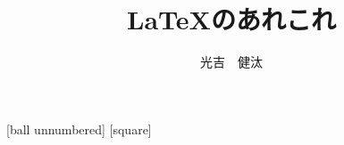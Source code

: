 \usepackage{bxdpx-beamer} %
\usepackage{pxjahyper} %
\usepackage{minijs} %
\usepackage{latexsym}
\usepackage[deluxe,expert]{otf}
\renewcommand{\kanjifamilydefault}{\gtdefault} %

\usepackage{tikz}
\usepackage{pgfplots}
\usepackage{pgfplotstable}
\usetikzlibrary{calc,decorations.pathreplacing,quotes,positioning,shapes,fit,arrows,backgrounds,tikzmark}

\usepackage{standalone}
\usepackage{import}

\usepackage{xcolor}
[ball unnumbered]
[square]

\usepackage[T1]{fontenc}%
\usepackage[utf8]{inputenc}%
\usepackage{txfonts}%
\usepackage{bm}%

\usepackage{amsmath,amssymb}
\usepackage{amsthm}
\usepackage{algorithm, algpseudocode}
\usepackage{enumitem}
\usepackage{filecontents}
\usepackage{listings, jlisting}
\usepackage{caption}

\newcommand{\func}[1]{\ensuremath\mathrm{#1}}
\newcommand{\Scatter}{\text{\scshape Scatter}}
\newcommand{\Gather}{\text{\textsc{Gather}}}
\newcommand{\Propagate}{\func{\text{\textsc{Propagate}}}}
\newcommand{\ShiftAnd}{\textbf{Shift-And}}
\newcommand{\BNDM}{\textbf{BNDM}}
\newcommand{\ExShiftAnd}{\textbf{Extended-Shift-And}}
\newcommand{\ExBNDM}{\textbf{Extended-BNDM}}
\providecommand{\as}{\textasteriskcentered}
\providecommand{\pl}{\text{+}}

\providecommand{\ImportStandalone}[3]{
	\IfStandalone{
		{#3}
		}{
		{#3}
	}
}

\title{\LaTeX のあれこれ}
\author{光吉　健汰}
